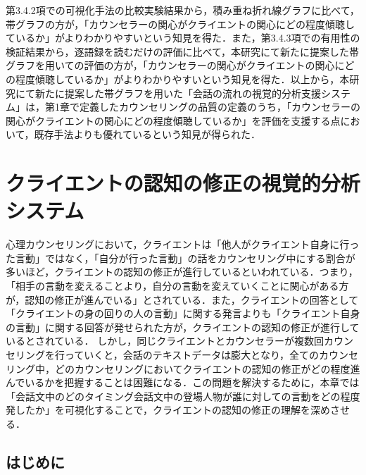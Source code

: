\documentclass[shuuron]{kuee}
\begin{document}
第3.4.2項での可視化手法の比較実験結果から，積み重ね折れ線グラフに比べて，帯グラフの方が，「カウンセラーの関心がクライエントの関心にどの程度傾聴しているか」がよりわかりやすいという知見を得た．また，第3.4.3項での有用性の検証結果から，逐語録を読むだけの評価に比べて，本研究にて新たに提案した帯グラフを用いての評価の方が，「カウンセラーの関心がクライエントの関心にどの程度傾聴しているか」がよりわかりやすいという知見を得た．以上から，本研究にて新たに提案した帯グラフを用いた「会話の流れの視覚的分析支援システム」は，第1章で定義したカウンセリングの品質の定義のうち，「カウンセラーの関心がクライエントの関心にどの程度傾聴しているか」を評価を支援する点において，既存手法よりも優れているという知見が得られた．




\chapter{クライエントの認知の修正の視覚的分析システム}

心理カウンセリングにおいて，クライエントは「他人がクライエント自身に行った言動」ではなく，「自分が行った言動」の話をカウンセリング中にする割合が多いほど，クライエントの認知の修正が進行しているといわれている．つまり，「相手の言動を変えることより，自分の言動を変えていくことに関心がある方が，認知の修正が進んでいる」\cite{zokad}とされている．また，クライエントの回答として「クライエントの身の回りの人の言動」に関する発言よりも「クライエント自身の言動」に関する回答が発せられた方が，クライエントの認知の修正が進行しているとされている．
しかし，同じクライエントとカウンセラーが複数回カウンセリングを行っていくと，会話のテキストデータは膨大となり，全てのカウンセリング中，どのカウンセリングにおいてクライエントの認知の修正がどの程度進んでいるかを把握することは困難になる．この問題を解決するために，本章では「会話文中のどのタイミング会話文中の登場人物が誰に対しての言動をどの程度発したか」を可視化することで，クライエントの認知の修正の理解を深めさせる．

\section{はじめに}
\end{document}
